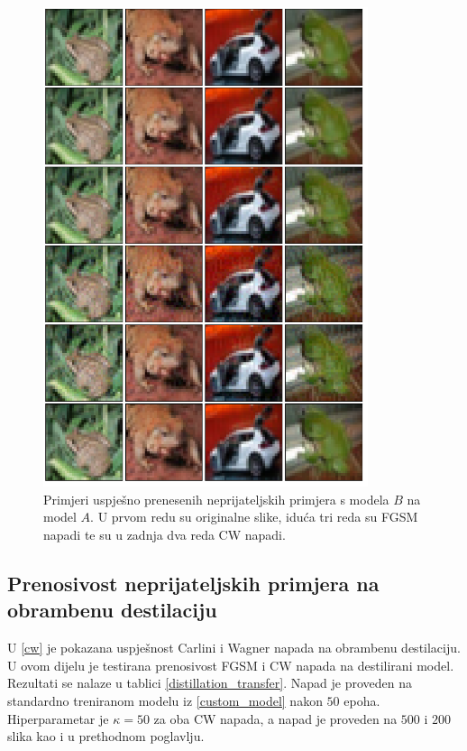 \documentclass[utf8, diplomski]{fer}
\begin{document}
\begin{figure}[H]
\centering
\includegraphics[width=0.85\textwidth,keepaspectratio]{img/results/transferability_b_to_a.png}
\caption{Primjeri uspješno prenesenih neprijateljskih primjera s modela $B$ na model $A$. U prvom redu su originalne slike, iduća tri reda su FGSM napadi te su u zadnja dva reda CW napadi.}
\label{fig:transferability_b_to_a}
\end{figure}


\subsection{Prenosivost neprijateljskih primjera na obrambenu destilaciju}
U \ref{cw} je pokazana uspješnost Carlini i Wagner napada na obrambenu destilaciju. U ovom dijelu je testirana prenosivost FGSM i CW napada na destilirani model. Rezultati se nalaze u tablici \ref{distillation_transfer}. Napad je proveden na standardno treniranom modelu iz \ref{custom_model} nakon $50$ epoha. Hiperparametar je $\kappa = 50$ za oba CW napada, a napad je proveden na $500$ i $200$ slika kao i u prethodnom poglavlju.
\end{document}
